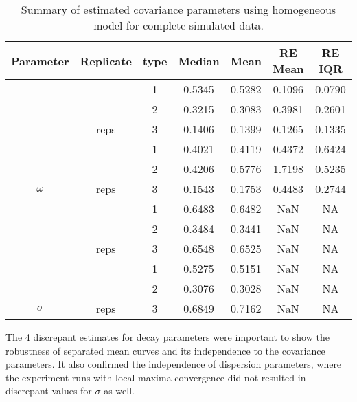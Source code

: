 \begin{table}[b]\centering
\caption{Summary of estimated covariance parameters using homogeneous model for complete simulated data.}
\begin{knitrout}
\color{fgcolor}
\begin{tabular}{ccccccc}
\toprule
Parameter & Replicate & type & Median & Mean & RE Mean & RE IQR\\
\midrule
 &  & 1 & 0.5345 & 0.5282 & 0.1096 & 0.0790\\

 &  & 2 & 0.3215 & 0.3083 & 0.3981 & 0.2601\\

 & \multirow{-3}{*}{\centering\arraybackslash 30 reps} & 3 & 0.1406 & 0.1399 & 0.1265 & 0.1335\\
\cmidrule{2-7}
 &  & 1 & 0.4021 & 0.4119 & 0.4372 & 0.6424\\

 &  & 2 & 0.4206 & 0.5776 & 1.7198 & 0.5235\\

\multirow{-6}{*}{\centering\arraybackslash $\omega$} & \multirow{-3}{*}{\centering\arraybackslash 5 reps} & 3 & 0.1543 & 0.1753 & 0.4483 & 0.2744\\
\cmidrule{1-7}
 &  & 1 & 0.6483 & 0.6482 & NaN & NA\\

 &  & 2 & 0.3484 & 0.3441 & NaN & NA\\

 & \multirow{-3}{*}{\centering\arraybackslash 30 reps} & 3 & 0.6548 & 0.6525 & NaN & NA\\
\cmidrule{2-7}
 &  & 1 & 0.5275 & 0.5151 & NaN & NA\\

 &  & 2 & 0.3076 & 0.3028 & NaN & NA\\

\multirow{-6}{*}{\centering\arraybackslash $\sigma$} & \multirow{-3}{*}{\centering\arraybackslash 5 reps} & 3 & 0.6849 & 0.7162 & NaN & NA\\
\bottomrule
\end{tabular}


\end{knitrout}
\label{tab:par-comp2homog}
\end{table}
The 4 discrepant estimates for decay parameters were important to show the robustness of separated mean curves and its independence to the covariance parameters. It also confirmed the independence of dispersion parameters, where the experiment runs with local maxima convergence did not resulted in  discrepant values for $\sigma$ as well.

